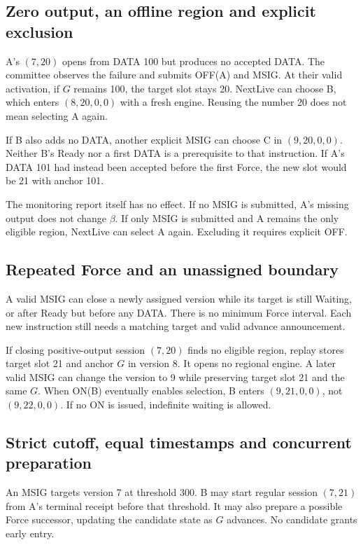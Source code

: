 \subsection{Zero output, an offline region and explicit exclusion}
\label{sec:retry-example}
A's $(7,20)$ opens from DATA 100 but produces no accepted DATA.
The committee observes the failure and submits OFF(A) and MSIG.
At their valid activation, if $G$ remains 100, the target slot stays
20. NextLive can choose B, which enters $(8,20,0,0)$ with a fresh
engine. Reusing the number 20 does not mean selecting A again.

If B also adds no DATA, another explicit MSIG can choose C in
$(9,20,0,0)$. Neither B's Ready nor a first DATA is a prerequisite
to that instruction. If A's DATA 101 had instead been accepted before
the first Force, the new slot would be 21 with anchor 101.

The monitoring report itself has no effect. If no MSIG is submitted,
A's missing output does not change $\beta$. If only MSIG is submitted
and A remains the only eligible region, NextLive can select A again.
Excluding it requires explicit OFF.

\subsection{Repeated Force and an unassigned boundary}
\label{sec:repeated-force}
A valid MSIG can close a newly assigned version while its target is
still Waiting, or after Ready but before any DATA. There is no minimum
Force interval. Each new instruction still needs a matching target
and valid advance announcement.

If closing positive-output session $(7,20)$ finds no eligible region,
replay stores target slot 21 and anchor $G$ in version 8. It opens no
regional engine. A later valid MSIG can change the version to 9 while
preserving target slot 21 and the same $G$. When ON(B) eventually
enables selection, B enters $(9,21,0,0)$, not $(9,22,0,0)$.
If no ON is issued, indefinite waiting is allowed.

\subsection{Strict cutoff, equal timestamps and concurrent preparation}
\label{sec:cutoff-example}
An MSIG targets version 7 at threshold 300. B may start regular
session $(7,21)$ from A's terminal receipt before that threshold.
It may also prepare a possible Force successor, updating the candidate
state as $G$ advances. No candidate grants early entry.

